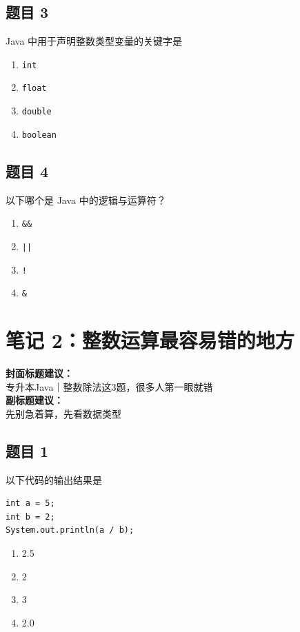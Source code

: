 \documentclass[12pt,a4paper]{ctexart}
\begin{document}
\subsection*{题目 3}
Java 中用于声明整数类型变量的关键字是
\begin{enumerate}[label=\Alph*.]
    \item \texttt{int}
    \item \texttt{float}
    \item \texttt{double}
    \item \texttt{boolean}
\end{enumerate}

\subsection*{题目 4}
以下哪个是 Java 中的逻辑与运算符？
\begin{enumerate}[label=\Alph*.]
    \item \texttt{\&\&}
    \item \texttt{||}
    \item \texttt{!}
    \item \texttt{\&}
\end{enumerate}

\newpage

\section{笔记 2：整数运算最容易错的地方}
\begin{coverbox}
\textbf{封面标题建议：}\\
专升本Java｜整数除法这3题，很多人第一眼就错\\
\textbf{副标题建议：}\\
先别急着算，先看数据类型
\end{coverbox}

\subsection*{题目 1}
以下代码的输出结果是
\begin{lstlisting}
int a = 5;
int b = 2;
System.out.println(a / b);
\end{lstlisting}

\begin{enumerate}[label=\Alph*.]
    \item 2.5
    \item 2
    \item 3
    \item 2.0
\end{enumerate}
\end{document}
